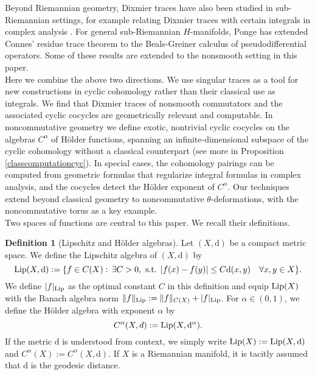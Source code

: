 \documentclass[10pt]{amsart}
\theoremstyle{remark}
\theoremstyle{definition}
\newtheorem{deef*}[thm*]{Definition}
\begin{document}
Beyond Riemannian geometry, Dixmier traces have also been studied in sub-Riemannian settings, for example relating Dixmier traces with certain integrals in complex analysis \cite{engroch, engzh,engzhtwo}. For general sub-Riemannian $H$-manifolds, Ponge \cite{pongeresidue} has extended Connes' residue trace theorem to the Beals-Greiner calculus of pseudodifferential operators. Some of these results are extended to the nonsmooth setting in this paper.
\\

Here we combine the above two directions. We use singular traces as a tool for new constructions in cyclic cohomology rather than their classical use as integrals. We find that Dixmier traces of nonsmooth commutators and the associated cyclic cocycles are geometrically relevant and computable. In noncommutative geometry we define exotic, nontrivial cyclic cocycles on the algebras $C^\alpha$ of H\"{o}lder functions, spanning an infinite-dimensional subspace of the cyclic cohomology without a classical counterpart (see more in Proposition \ref{classcomputationcyc}). In special cases, the cohomology pairings can be computed from geometric formulas that regularize integral formulas in complex analysis, and the cocycles detect the H\"{o}lder exponent of $C^{\alpha}$. Our techniques extend beyond classical geometry to noncommutative $\theta$-deformations, with the noncommutative torus as a key example.\\

Two spaces of functions are central to this paper. We recall their definitions.

\begin{deef*}[Lipschitz and H\"{o}lder algebras]
\label{lipdef}
Let $(X,{\mathrm{d}})$ be a compact metric space. We define the Lipschitz algebra of $(X,{\mathrm{d}})$ by
$${\textnormal{Lip}}(X,{\mathrm{d}}):=\{f\in C(X):\,\exists C>0, \mbox{   s.t.   } |f(x)-f(y)|\leq C{\mathrm{d}}(x,y)\quad\forall x,y\in X\}.$$
We define $|f|_{\textnormal{Lip}}$ as the optimal constant $C$ in this definition and equip ${\textnormal{Lip}}(X)$ with the Banach algebra norm $\|f\|_{\textnormal{Lip}}:=\|f\|_{C(X)}+|f|_{\textnormal{Lip}}$. For $\alpha\in (0,1)$, we define the H\"{o}lder algebra with exponent $\alpha$ by
$$C^\alpha(X,d):={\textnormal{Lip}}(X,{\mathrm{d}}^\alpha).$$
If the metric ${\mathrm{d}}$ is understood from context, we simply write ${\textnormal{Lip}}(X):={\textnormal{Lip}}(X,{\mathrm{d}})$ and $C^\alpha(X):=C^\alpha(X,{\mathrm{d}})$. If $X$ is a Riemannian manifold, it is tacitly assumed that ${\mathrm{d}}$ is the geodesic distance.
\end{deef*}
\end{document}
